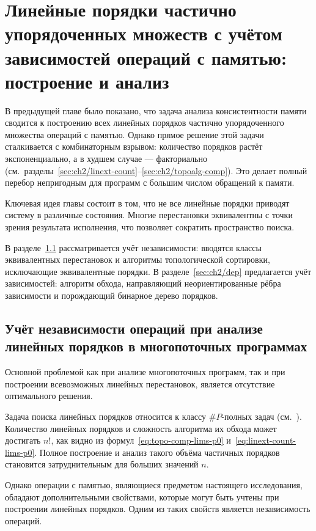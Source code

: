 \chapter{Линейные порядки частично упорядоченных множеств с учётом
зависимостей операций с памятью: построение и анализ}\label{sec:ch3}

В предыдущей главе было показано, что задача анализа консистентности
памяти сводится к построению всех линейных порядков частично
упорядоченного множества операций с памятью. Однако прямое решение
этой задачи сталкивается с комбинаторным взрывом: количество порядков
растёт экспоненциально, а в худшем случае — факториально
(см.~разделы~\ref{sec:ch2/linext-count}–\ref{sec:ch2/topoalg-comp}). Это
делает полный перебор непригодным для программ с большим числом
обращений к памяти.

Ключевая идея главы состоит в том, что не все линейные порядки
приводят систему в различные состояния. Многие перестановки
эквивалентны с точки зрения результата исполнения, что позволяет
сократить пространство поиска.

В разделе~\ref{sec:ch2/indep} рассматривается учёт независимости:
вводятся классы эквивалентных перестановок и алгоритмы топологической
сортировки, исключающие эквивалентные порядки. В
разделе~\ref{sec:ch2/dep} предлагается учёт зависимостей: алгоритм
обхода, направляющий неориентированные рёбра зависимости и
порождающий бинарное дерево порядков.

\section{Учёт независимости операций при анализе линейных порядков в
многопоточных программах}
\label{sec:ch2/indep}

Основной проблемой как при анализе многопоточных программ, так и при
построении всевозможных линейных перестановок, является отсутствие
оптимального решения.

Задача поиска линейных порядков относится к классу $\#P$-полных задач
(см.~\cite{linextcount}). Количество линейных порядков и сложность
алгоритма их обхода может достигать $n!$, как видно из
формул~\eqref{eq:topo-comp-lims-p0}
и~\eqref{eq:linext-count-lims-p0}. Полное построение и анализ такого
объёма частичных порядков становится затруднительным для больших значений $n$.

Однако операции с памятью, являющиеся предметом настоящего
исследования, обладают дополнительными свойствами, которые могут быть
учтены при построении линейных порядков. Одним из таких свойств
является независимость операций.

